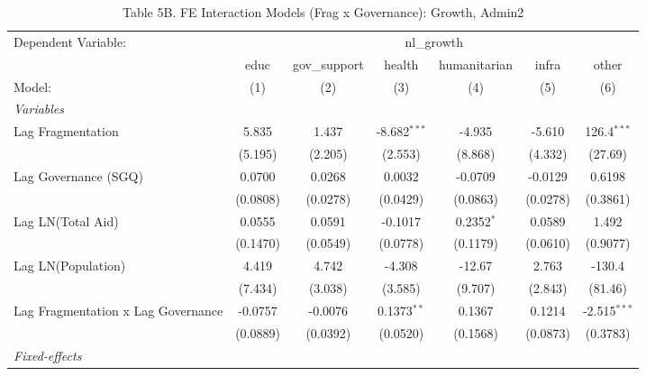 \par\endgroup



\begin{table}[H]
   \caption{Table 5B. FE Interaction Models (Frag x Governance): Growth, Admin2}
   \centering
   \begin{tabular}{lcccccc}
      \tabularnewline \midrule \midrule
      Dependent Variable: & \multicolumn{6}{c}{nl\_growth}\\
                                         & educ     & gov\_support  & health         & humanitarian & infra    & other \\   
      Model:                             & (1)      & (2)           & (3)            & (4)          & (5)      & (6)\\  
      \midrule
      \emph{Variables}\\
      Lag Fragmentation                  & 5.835    & 1.437         & -8.682$^{***}$ & -4.935       & -5.610   & 126.4$^{***}$\\   
                                         & (5.195)  & (2.205)       & (2.553)        & (8.868)      & (4.332)  & (27.69)\\   
      Lag Governance (SGQ)               & 0.0700   & 0.0268        & 0.0032         & -0.0709      & -0.0129  & 0.6198\\   
                                         & (0.0808) & (0.0278)      & (0.0429)       & (0.0863)     & (0.0278) & (0.3861)\\   
      Lag LN(Total Aid)                  & 0.0555   & 0.0591        & -0.1017        & 0.2352$^{*}$ & 0.0589   & 1.492\\   
                                         & (0.1470) & (0.0549)      & (0.0778)       & (0.1179)     & (0.0610) & (0.9077)\\   
      Lag LN(Population)                 & 4.419    & 4.742         & -4.308         & -12.67       & 2.763    & -130.4\\   
                                         & (7.434)  & (3.038)       & (3.585)        & (9.707)      & (2.843)  & (81.46)\\   
      Lag Fragmentation x Lag Governance & -0.0757  & -0.0076       & 0.1373$^{**}$  & 0.1367       & 0.1214   & -2.515$^{***}$\\   
                                         & (0.0889) & (0.0392)      & (0.0520)       & (0.1568)     & (0.0873) & (0.3783)\\   
      \midrule
      \emph{Fixed-effects}\\

\end{tabular}
\end{table}
